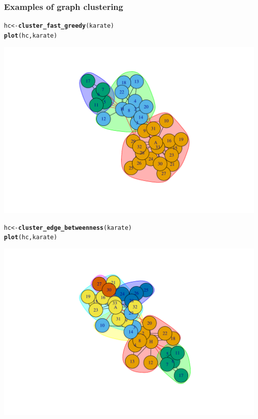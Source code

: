 \documentclass{beamer}\usepackage[]{graphicx}\usepackage[]{color}
\makeatletter
\newcommand{\hlstd}[1]{\textcolor[rgb]{0.345,0.345,0.345}{#1}}%
\newcommand{\hlkwb}[1]{\textcolor[rgb]{0.69,0.353,0.396}{#1}}%
\newcommand{\hlkwd}[1]{\textcolor[rgb]{0.737,0.353,0.396}{\textbf{#1}}}%
\newenvironment{kframe}{%
 \def\at@end@of@kframe{}%
 \ifinner\ifhmode%
  \def\at@end@of@kframe{\end{minipage}}%
  \begin{minipage}{\columnwidth}%
 \fi\fi%
 \def\FrameCommand##1{\hskip\@totalleftmargin \hskip-\fboxsep
 \colorbox{shadecolor}{##1}\hskip-\fboxsep
     \hskip-\linewidth \hskip-\@totalleftmargin \hskip\columnwidth}%
 \MakeFramed {\advance\hsize-\width
   \@totalleftmargin\z@ \linewidth\hsize
   \@setminipage}}%
 {\par\unskip\endMakeFramed%
 \at@end@of@kframe}
\newenvironment{knitrout}{}{} %
\makeatother
\begin{document}
\begin{frame}
  \frametitle{Examples of graph clustering}

\begin{knitrout}\scriptsize
{}\color{fgcolor}\begin{kframe}
\begin{alltt}
\hlstd{hc} \hlkwb{<-} \hlkwd{cluster_fast_greedy}\hlstd{(karate)}
\hlkwd{plot}\hlstd{(hc,karate)}
\end{alltt}
\end{kframe}
\includegraphics[width=.8\textwidth]{figures/unnamed-chunk-2-1} 

\end{knitrout}

\begin{knitrout}\scriptsize
{}\color{fgcolor}\begin{kframe}
\begin{alltt}
\hlstd{hc} \hlkwb{<-} \hlkwd{cluster_edge_betweenness}\hlstd{(karate)}
\hlkwd{plot}\hlstd{(hc,karate)}
\end{alltt}
\end{kframe}
\includegraphics[width=.8\textwidth]{figures/unnamed-chunk-3-1} 


\end{knitrout}
\end{frame}
\end{document}
